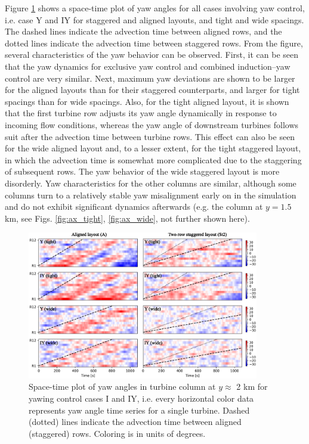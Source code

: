 \documentclass[a4paper]{jpconf}
\begin{document}
Figure \ref{fig:yaw} shows a space-time plot of yaw angles for all cases involving yaw control, i.e. case Y and IY for staggered and aligned layouts, and tight and wide spacings. The dashed lines indicate the advection time between aligned rows, and the dotted lines indicate the advection time between staggered rows. From the figure, several characteristics of the yaw behavior can be observed. First, it can be seen that the yaw dynamics for exclusive yaw control and combined induction--yaw control are very similar. Next, maximum yaw deviations are shown to be larger for the aligned layouts than for their staggered counterparts, and larger for tight spacings than for wide spacings. Also, for the tight aligned layout, it is shown that the first turbine row adjusts its yaw angle dynamically in response to incoming flow conditions, whereas the yaw angle of downstream turbines follows suit after the advection time between turbine rows. This effect can also be seen for the wide aligned layout and, to a lesser extent, for the tight staggered layout, in which the advection time is somewhat more complicated due to the staggering of subsequent rows. The yaw behavior of the wide staggered layout is more disorderly. Yaw characteristics for the other columns are similar, although some columns turn to a relatively stable yaw misalignment early on in the simulation and do not exhibit significant dynamics afterwards (e.g. the column at $y = 1.5$ km, see Figs. \ref{fig:ax_tight}, \ref{fig:ax_wide}, not further shown here).

\begin{figure}[t]
	\centering
	\includegraphics[width=0.9\textwidth]{Torque18/yaw_angles}
	\caption{Space-time plot of yaw angles in turbine column at $y \approx $ 2 km for yawing control cases I and IY, i.e. every horizontal color data represents yaw angle time series for a single turbine. Dashed (dotted) lines indicate the advection time between aligned (staggered) rows. Coloring is in units of degrees. \label{fig:yaw}}
\end{figure}
\end{document}
